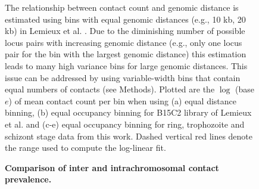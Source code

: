 \documentclass{article}
\begin{document}
\begin{figure}
\begin{center}
\end{center}
\caption{{\bf Comparison of inter and intrachromosomal contact prevalence. }}
{ The relationship between contact count and genomic distance is estimated
    using bins with equal genomic distances (e.g., 10 kb, 20 kb) in Lemieux
    et al. \cite{lemieux:genome-wide}. Due to the diminishing number of possible
    locus pairs with increasing genomic distance (e.g., only one locus pair for
    the bin with the largest genomic distance) this estimation leads to many
    high variance bins for large genomic distances. This issue can be addressed
    by using variable-width bins that contain equal numbers of
    contacts (see Methods). Plotted are the $\log$ (base $e$) of mean
    contact count per bin when using (a) equal distance binning, (b)
    equal occupancy binning for B15C2 library of Lemieux et
    al. \cite{lemieux:genome-wide} and (c-e) equal occupancy binning for
    ring, trophozoite and schizont stage data from this work. Dashed vertical
    red lines denote the range used to compute the log-linear fit.
}
\label{suppfig:intraVSinter}
\end{figure}
\clearpage
\end{document}

